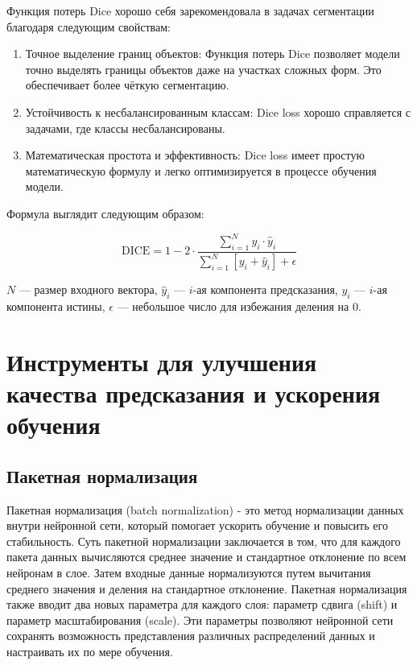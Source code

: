 Функция потерь Dice хорошо себя зарекомендовала в задачах сегментации благодаря
следующим свойствам:

\begin{enumerate}

	\item Точное выделение границ объектов: Функция потерь Dice позволяет
	модели точно выделять границы объектов даже на участках сложных форм. Это
	обеспечивает более чёткую сегментацию.

	\item Устойчивость к несбалансированным классам: Dice loss хорошо
	справляется с задачами, где классы несбалансированы.

	\item Математическая простота и эффективность: Dice loss имеет простую
	математическую формулу и легко оптимизируется в процессе обучения модели.

\end{enumerate}

Формула выглядит следующим образом:

\begin{equation}
	\text{DICE} = 1 - 2 \cdot \frac{\sum_{i=1}^{N} y_i \cdot \hat{y}_i}{\sum_{i=1}^{N} \left[y_i + \hat{y}_i \right] + \epsilon}
\end{equation}


\noindent $N$ --- размер входного вектора, $\hat{y}_i$ --- $i$-ая компонента
предсказания, $y_i$ --- $i$-ая компонента истины, $\epsilon$ --- небольшое
число для избежания деления на 0.

\section{Инструменты для улучшения качества предсказания и ускорения обучения}

\subsection{Пакетная нормализация}

Пакетная нормализация (batch normalization) - это метод нормализации данных
внутри нейронной сети, который помогает ускорить обучение и повысить его
стабильность. Суть пакетной нормализации заключается в том, что для каждого
пакета данных вычисляются среднее значение и стандартное отклонение по всем
нейронам в слое. Затем входные данные нормализуются путем вычитания среднего
значения и деления на стандартное отклонение. Пакетная нормализация также
вводит два новых параметра для каждого слоя: параметр сдвига (shift) и параметр
масштабирования (scale). Эти параметры позволяют нейронной сети сохранять
возможность представления различных распределений данных и настраивать их по
мере обучения.

